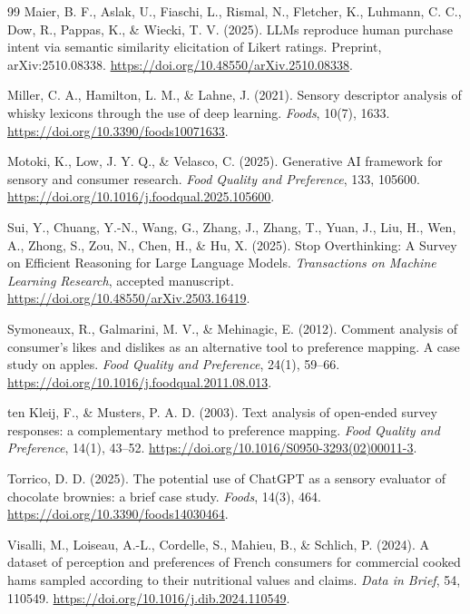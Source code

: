 \documentclass[12pt]{article}
\begin{document}
\begin{thebibliography}{99}
Maier, B. F., Aslak, U., Fiaschi, L., Rismal, N., Fletcher, K., Luhmann, C. C., Dow, R., Pappas, K., \& Wiecki, T. V. (2025).
LLMs reproduce human purchase intent via semantic similarity elicitation of Likert ratings.
Preprint, arXiv:2510.08338.
\url{https://doi.org/10.48550/arXiv.2510.08338}.

Miller, C. A., Hamilton, L. M., \& Lahne, J. (2021).
Sensory descriptor analysis of whisky lexicons through the use of deep learning.
\textit{Foods}, 10(7), 1633.
\url{https://doi.org/10.3390/foods10071633}.

Motoki, K., Low, J. Y. Q., \& Velasco, C. (2025).
Generative AI framework for sensory and consumer research.
\textit{Food Quality and Preference}, 133, 105600.
\url{https://doi.org/10.1016/j.foodqual.2025.105600}.

Sui, Y., Chuang, Y.-N., Wang, G., Zhang, J., Zhang, T., Yuan, J., Liu, H., Wen, A., Zhong, S., Zou, N., Chen, H., \& Hu, X. (2025).
Stop Overthinking: A Survey on Efficient Reasoning for Large Language Models.
\textit{Transactions on Machine Learning Research}, accepted manuscript.
\url{https://doi.org/10.48550/arXiv.2503.16419}.

Symoneaux, R., Galmarini, M. V., \& Mehinagic, E. (2012).
Comment analysis of consumer's likes and dislikes as an alternative tool to preference mapping. A case study on apples.
\textit{Food Quality and Preference}, 24(1), 59--66.
\url{https://doi.org/10.1016/j.foodqual.2011.08.013}.

ten Kleij, F., \& Musters, P. A. D. (2003).
Text analysis of open-ended survey responses: a complementary method to preference mapping.
\textit{Food Quality and Preference}, 14(1), 43--52.
\url{https://doi.org/10.1016/S0950-3293(02)00011-3}.

Torrico, D. D. (2025).
The potential use of ChatGPT as a sensory evaluator of chocolate brownies: a brief case study.
\textit{Foods}, 14(3), 464.
\url{https://doi.org/10.3390/foods14030464}.

Visalli, M., Loiseau, A.-L., Cordelle, S., Mahieu, B., \& Schlich, P. (2024).
A dataset of perception and preferences of French consumers for commercial cooked hams sampled according to their nutritional values and claims.
\textit{Data in Brief}, 54, 110549.
\url{https://doi.org/10.1016/j.dib.2024.110549}.


\end{thebibliography}
\end{document}
